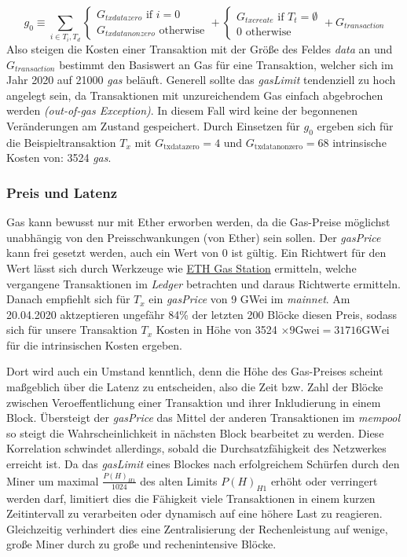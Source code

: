 \documentclass[runningheads]{llncs}
\begin{document}
$$ g_0 \equiv \sum_{i \in T_i, T_d}
  \begin{cases}
    G_{txdatazero} \text{ if } i=0 \\
    G_{txdatanonzero} \text{ otherwise}
  \end{cases}
  +
  \begin{cases}
    G_{txcreate} \text{ if } T_t = \emptyset \\
    0 \text{ otherwise}
  \end{cases}
  +
  G_{transaction}
$$
Also steigen die Kosten einer Transaktion mit der Größe des Feldes \textit{data} an und $ G_{transaction} $ bestimmt den Basiswert an Gas für eine Transaktion, welcher sich im Jahr 2020 auf 21000 \textit{gas} beläuft. Generell sollte das \textit{gasLimit} tendenziell zu hoch angelegt sein, da Transaktionen mit unzureichendem Gas einfach abgebrochen werden \textit{(out-of-gas Exception)}. In diesem Fall wird keine der begonnenen Veränderungen am Zustand gespeichert. Durch Einsetzen für $ g_0 $ ergeben sich für die Beispieltransaktion $ T_x $ mit $ G_{\text{txdatazero}} = 4 $ und $ G_{\text{txdatanonzero}} = 68 $ intrinsische Kosten von: 3524 \textit{gas}. \cite{neemann_appendix_nodate}

\subsubsection{Preis und Latenz}
Gas kann bewusst nur mit Ether erworben werden, da die Gas-Preise möglichst unabhängig von den Preisschwankungen (von Ether) sein sollen. Der \textit{gasPrice} kann frei gesetzt werden, auch ein Wert von 0 ist gültig. Ein Richtwert für den Wert lässt sich durch Werkzeuge wie \href{https://www.ethgasstation.info/}{ETH Gas Station} ermitteln, welche vergangene Transaktionen im \textit{Ledger} betrachten und daraus Richtwerte ermitteln. Danach empfiehlt sich für $ T_x $ ein \textit{gasPrice} von 9 GWei im \textit{mainnet}. Am 20.04.2020 aktzeptieren ungefähr 84\% der letzten 200 Blöcke diesen Preis, sodass sich für unsere Transaktion $ T_x $ Kosten in Höhe von 3524 $ \times 9 \text{Gwei} = 31716 \text{GWei} $ für die intrinsischen Kosten ergeben.

Dort wird auch ein Umstand kenntlich, denn die Höhe des Gas-Preises scheint maßgeblich über die Latenz zu entscheiden, also die Zeit bzw. Zahl der Blöcke zwischen Veroeffentlichung einer Transaktion und ihrer Inkludierung in einem Block. Übersteigt der \textit{gasPrice} das Mittel der anderen Transaktionen im \textit{mempool} so steigt die Wahrscheinlichkeit in nächsten Block bearbeitet zu werden. Diese Korrelation schwindet allerdings, sobald die Durchsatzfähigkeit des Netzwerkes erreicht ist. \cite[S. 30 f.]{pierro_influence_2019} Da das \textit{gasLimit} eines Blockes nach erfolgreichem Schürfen durch den Miner um maximal $ \frac{P(H)_{H1}}{1024} $ des alten Limits  $ P(H)_{H1} $ erhöht oder verringert werden darf, limitiert dies die Fähigkeit viele Transaktionen in einem kurzen Zeitintervall zu verarbeiten oder dynamisch auf eine höhere Last zu reagieren. Gleichzeitig  verhindert dies eine Zentralisierung der Rechenleistung auf wenige, große Miner durch zu große und rechenintensive Blöcke.
\end{document}

